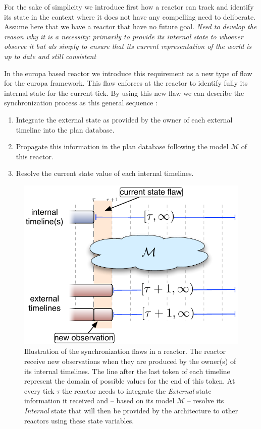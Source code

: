 For the sake of simplicity we introduce first how a reactor can track
and identify its state in the context where it does not have any
compelling need to deliberate. Assume here that we have a reactor that
have no future goal. {\em Need to develop the reason why it is a
  necessity: primarily to provide its internal state to whoever
  observe it but als simply to ensure that its current representation
  of the world is up to date and still consistent}

In the europa based reactor we introduce this requirement as a new
type of flaw for the europa framework. This flaw enforces at the
reactor to identify fully its internal state for the current
tick. By using this new flaw we can describe the synchronization
process as this general sequence :
\begin{enumerate}
\item Integrate the external state as provided by the owner of each
  external timeline into the plan database.
\item Propagate this information in the plan database following the
  model $\mathcal{M}$ of this reactor.
\item Resolve the current state value of each internal timelines.
\end{enumerate}

\begin{figure}[!htbp]
  \centering
  \includegraphics[width=0.5\columnwidth]{figs/synch-relation}
  \caption{Illustration of the synchronization flaws in a reactor. The
    reactor receive new observations when they are produced by the
    owner(s) of its internal timelines. The line after the last token
    of each timeline represent the domain of possible values for the
    end of this token. At every tick $\tau$ the reactor needs to
    integrate the {\em External} state information it received and --
    based on its model $\mathcal{M}$ -- resolve its {\em Internal}
    state that will then be provided by the architecture to other
    reactors using these state variables.}
  \label{fig:synch:flaw}
\end{figure}

